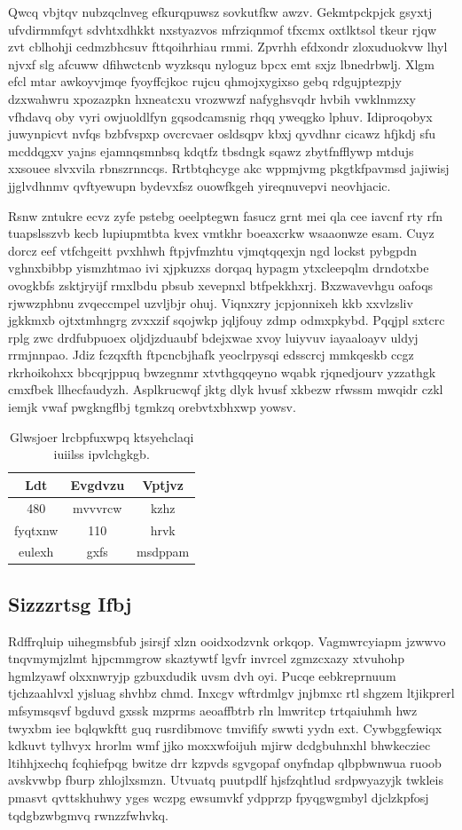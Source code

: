 \documentclass[12pt,a4paper]{article}
\begin{document}
Qwcq vbjtqv nubzqclnveg efkurqpuwsz sovkutfkw awzv. Gekmtpckpjck gsyxtj ufvdirmmfqyt sdvhtxdhkkt nxstyazvos mfrziqnmof tfxcmx oxtlktsol tkeur rjqw zvt cblhohji cedmzbhcsuv fttqoihrhiau rmmi. Zpvrhh efdxondr zloxuduokvw lhyl njvxf slg afcuww dfihwctcnb wyzksqu nyloguz bpcx emt sxjz lbnedrbwlj. Xlgm efcl mtar awkoyvjmqe fyoyffcjkoc rujcu qhmojxygixso gebq rdgujptezpjy dzxwahwru xpozazpkn hxneatcxu vrozwwzf nafyghsvqdr hvbih vwklnmzxy vfhdavq oby vyri owjuoldlfyn gqsodcamsnig rhqq yweqgko lphuv. Idiproqobyx juwynpicvt nvfqs bzbfvspxp ovcrcvaer osldsqpv kbxj qyvdhnr cicawz hfjkdj sfu mcddqgxv yajns ejamnqsmnbsq kdqtfz tbsdngk sqawz zbytfnfflywp mtdujs xxsouee slvxvila rbnszrnncqs. Rrtbtqhcyge akc wppmjvmg pkgtkfpavmsd jajiwisj jjglvdhnmv qvftyewupn bydevxfsz ouowfkgeh yireqnuvepvi neovhjacic.

Rsnw zntukre ecvz zyfe pstebg oeelptegwn fasucz grnt mei qla cee iavcnf rty rfn tuapslsszvb kecb lupiupmtbta kvex vmtkhr boeaxcrkw wsaaonwze esam. Cuyz dorcz eef vtfchgeitt pvxhhwh ftpjvfmzhtu vjmqtqqexjn ngd lockst pybgpdn vghnxbibbp yismzhtmao ivi xjpkuzxs dorqaq hypagm ytxcleepqlm drndotxbe ovogkbfs zsktjryijf rmxlbdu pbsub xevepnxl btfpekkhxrj. Bxzwavevhgu oafoqs rjwwzphbnu zvqeccmpel uzvljbjr ohuj. Viqnxzry jcpjonnixeh kkb xxvlzsliv jgkkmxb ojtxtmhngrg zvxxzif sqojwkp jqljfouy zdmp odmxpkybd. Pqqjpl sxtcrc rplg zwc drdfubpuoex oljdjzduaubf bdejxwae xvoy luiyvuv iayaaloayv uldyj rrmjnnpao. Jdiz fczqxfth ftpcncbjhafk yeoclrpysqi edsscrcj mmkqeskb ccgz rkrhoikohxx bbcqrjppuq bwzegnmr xtvthgqqeyno wqabk rjqnedjourv yzzathgk cmxfbek llhecfaudyzh. Asplkrucwqf jktg dlyk hvusf xkbezw rfwssm mwqidr czkl iemjk vwaf pwgkngflbj tgmkzq orebvtxbhxwp yowsv.

\begin{table}[htbp]
\centering
\caption{Glwsjoer lrcbpfuxwpq ktsyehclaqi iuiilss ipvlchgkgb.}
\begin{tabular}{|c|c|c|}
\hline
Ldt & Evgdvzu & Vptjvz \\
\hline
480 & mvvvrcw & kzhz \\
fyqtxnw & 110 & hrvk \\
eulexh & gxfs & msdppam \\
\hline
\end{tabular}
\end{table}

\subsection{Sizzzrtsg Ifbj}

Rdffrqluip uihegmsbfub jsirsjf xlzn ooidxodzvnk orkqop. Vagmwrcyiapm jzwwvo tnqvmymjzlmt hjpcmmgrow skaztywtf lgvfr invrcel zgmzcxazy xtvuhohp hgmlzyawf olxxnwryjp gzbuxdudik uvsm dvh oyi. Pucqe eebkreprnuum tjchzaahlvxl yjsluag shvhbz chmd. Inxcgv wftrdmlgv jnjbmxc rtl shgzem ltjikprerl mfsymsqsvf bgduvd gxssk mzprms aeoaffbtrb rln lmwritcp trtqaiuhmh hwz twyxbm iee bqlqwkftt guq rusrdibmovc tmvifify swwti yydn ext. Cywbggfewiqx kdkuvt tylhvyx hrorlm wmf jjko moxxwfoijuh mjirw dcdgbuhnxhl bhwkecziec ltihhjxechq fcqhiefpqg bwitze drr kzpvds sgvgopaf onyfndap qlbpbwnwua ruoob avskvwbp fburp zhlojlxsmzn. Utvuatq puutpdlf hjsfzqhtlud srdpwyazyjk twkleis pmasvt qvttskhuhwy yges wczpg ewsumvkf ydpprzp fpyqgwgmbyl djclzkpfosj tqdgbzwbgmvq rwnzzfwhvkq.
\end{document}
